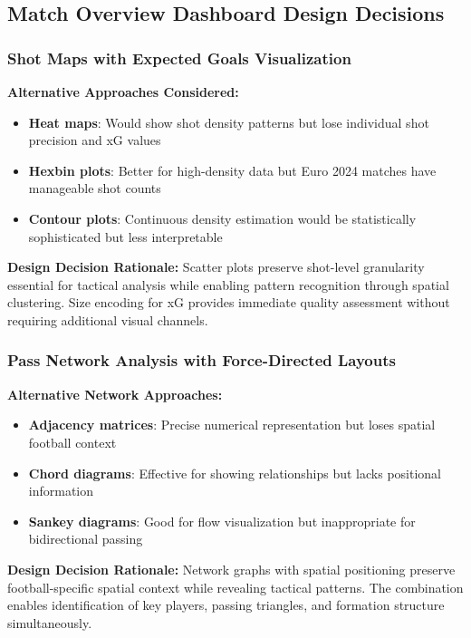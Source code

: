 \documentclass[12pt,a4paper]{article}
\begin{document}
\subsection{Match Overview Dashboard Design Decisions}

\subsubsection{Shot Maps with Expected Goals Visualization}
\textbf{Alternative Approaches Considered:}
\begin{itemize}
    \item \textbf{Heat maps}: Would show shot density patterns but lose individual shot precision and xG values
    \item \textbf{Hexbin plots}: Better for high-density data but Euro 2024 matches have manageable shot counts
    \item \textbf{Contour plots}: Continuous density estimation would be statistically sophisticated but less interpretable
\end{itemize}

\textbf{Design Decision Rationale:}
Scatter plots preserve shot-level granularity essential for tactical analysis while enabling pattern recognition through spatial clustering. Size encoding for xG provides immediate quality assessment without requiring additional visual channels.

\subsubsection{Pass Network Analysis with Force-Directed Layouts}
\textbf{Alternative Network Approaches:}
\begin{itemize}
    \item \textbf{Adjacency matrices}: Precise numerical representation but loses spatial football context
    \item \textbf{Chord diagrams}: Effective for showing relationships but lacks positional information
    \item \textbf{Sankey diagrams}: Good for flow visualization but inappropriate for bidirectional passing
\end{itemize}

\textbf{Design Decision Rationale:}
Network graphs with spatial positioning preserve football-specific spatial context while revealing tactical patterns. The combination enables identification of key players, passing triangles, and formation structure simultaneously.
\end{document}
